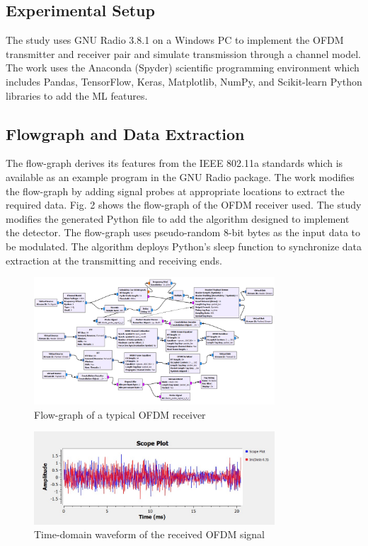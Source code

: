 \documentclass[conference]{IEEEtran}
\begin{document}
\subsection{Experimental Setup}
The study uses GNU Radio 3.8.1 on a Windows PC to implement the OFDM transmitter and receiver pair and simulate transmission through a channel model. The work uses the Anaconda (Spyder) scientific programming environment which includes Pandas, TensorFlow, Keras, Matplotlib, NumPy, and Scikit-learn Python libraries to add the ML features.  


\subsection{Flowgraph and Data Extraction}
 The flow-graph derives its features from the IEEE 802.11a standards \cite{b5} which is available as an example program in the GNU Radio package. The work modifies the flow-graph by adding signal probes at appropriate locations to extract the required data. Fig. 2 shows the flow-graph of the OFDM receiver used. The study modifies the generated Python file to add the algorithm designed to implement the detector. The flow-graph uses pseudo-random 8-bit bytes as the input data to be modulated. The algorithm deploys Python's sleep function to synchronize data extraction at the transmitting and receiving ends.
 
\begin{figure}[htbp]
\centerline{\includegraphics[width=9cm]{tx_ofdm.png}}
\caption{Flow-graph of a typical OFDM receiver}
\label{flowgraph}
\end{figure}

\begin{figure}[htbp]
\centerline{\includegraphics[width=9cm]{waveform.jpg}}
\caption{Time-domain waveform of the received OFDM signal}
\label{waveform}
\end{figure}
\end{document}
